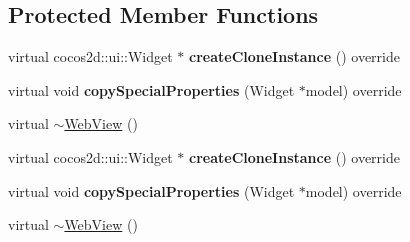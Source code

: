 \subsection*{Protected Member Functions}
\begin{DoxyCompactItemize}
\item 
\mbox{\label{classexperimental_1_1ui_1_1WebView_aeaedfee0fca4b17aeb04e8424a288fb7}} 
virtual cocos2d\+::ui\+::\+Widget $\ast$ {\bfseries create\+Clone\+Instance} () override
\item 
\mbox{\label{classexperimental_1_1ui_1_1WebView_af7bf27cd48f8f00bedfd708745381dd3}} 
virtual void {\bfseries copy\+Special\+Properties} (Widget $\ast$model) override
\item 
virtual \hyperlink{classexperimental_1_1ui_1_1WebView_aea2dc407800c093913815c36802c8edb}{$\sim$\+Web\+View} ()
\item 
\mbox{\label{classexperimental_1_1ui_1_1WebView_aeaedfee0fca4b17aeb04e8424a288fb7}} 
virtual cocos2d\+::ui\+::\+Widget $\ast$ {\bfseries create\+Clone\+Instance} () override
\item 
\mbox{\label{classexperimental_1_1ui_1_1WebView_af7bf27cd48f8f00bedfd708745381dd3}} 
virtual void {\bfseries copy\+Special\+Properties} (Widget $\ast$model) override
\item 
virtual \hyperlink{classexperimental_1_1ui_1_1WebView_aea2dc407800c093913815c36802c8edb}{$\sim$\+Web\+View} ()
\end{DoxyCompactItemize}
